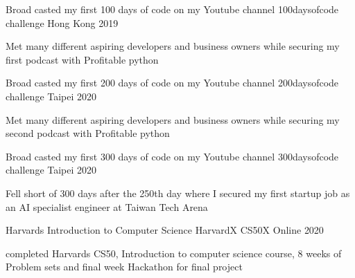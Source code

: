 

\begin{cventries}

  \cventry
    {Broad casted my first 100 days of code on my Youtube channel} %
    {100daysofcode challenge} %
    {Hong Kong } %
    {2019} %
    {
      \begin{cvitems} %
        \item {Met many different aspiring developers and business owners while securing my first podcast with Profitable python}
      \end{cvitems}
    }

  \cventry
    {Broad casted my first 200 days of code on my Youtube channel} %
    {200daysofcode challenge} %
    {Taipei} %
    {2020} %
    {
      \begin{cvitems} %
        \item {Met many different aspiring developers and business owners while securing my second podcast with Profitable python}
      \end{cvitems}
    }

  \cventry
    {Broad casted my first 300 days of code on my Youtube channel} %
    {300daysofcode challenge} %
    {Taipei} %
    {2020} %
    {
      \begin{cvitems} %
        \item {Fell short of 300 days after the 250th day where I secured my first startup job as an AI specialist engineer at Taiwan Tech Arena}
      \end{cvitems}
    }

  \cventry
    {Harvards Introduction to Computer Science} %
    {HarvardX CS50X} %
    {Online} %
    {2020} %
    {
      \begin{cvitems} %
        \item {completed Harvards CS50, Introduction to computer science course, 8 weeks of Problem sets and final week Hackathon for final project}
      \end{cvitems}
    }
\end{cventries}
